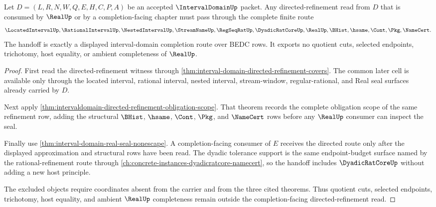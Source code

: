 \begin{theorem}
\label{thm:interval-domain-directed-completion-scope}
Let $D=(L,R,N,W,Q,E,H,C,P,A)$ be an accepted $\IntervalDomainUp$ packet. Any directed-refinement read from $D$ that is consumed by $\RealUp$ or by a completion-facing chapter must pass through the complete finite route
$$
\LocatedIntervalUp,\RationalIntervalUp,\NestedIntervalUp,\StreamNameUp,\RegSeqRatUp,\DyadicRatCoreUp,\RealUp,\BHist,\hsame,\Cont,\Pkg,\NameCert.
$$
The handoff is exactly a displayed interval-domain completion route over BEDC rows. It exports no quotient cuts, selected endpoints, trichotomy, host equality, or ambient completeness of $\RealUp$.
\end{theorem}
\begin{proof}
First read the directed-refinement witness through \autoref{thm:interval-domain-directed-refinement-covers}. The common later cell is available only through the located interval, rational interval, nested interval, stream-window, regular-rational, and Real seal surfaces already carried by $D$.

Next apply \autoref{thm:intervaldomain-directed-refinement-obligation-scope}. That theorem records the complete obligation scope of the same refinement row, adding the structural $\BHist$, $\hsame$, $\Cont$, $\Pkg$, and $\NameCert$ rows before any $\RealUp$ consumer can inspect the seal.

Finally use \autoref{thm:interval-domain-real-seal-nonescape}. A completion-facing consumer of $E$ receives the directed route only after the displayed approximation and structural rows have been read. The dyadic tolerance support is the same endpoint-budget surface named by the rational-refinement route through \autoref{ch:concrete-instances-dyadicratcore-namecert}, so the handoff includes $\DyadicRatCoreUp$ without adding a new host principle.

The excluded objects require coordinates absent from the carrier and from the three cited theorems. Thus quotient cuts, selected endpoints, trichotomy, host equality, and ambient $\RealUp$ completeness remain outside the completion-facing directed-refinement read.
\end{proof}

